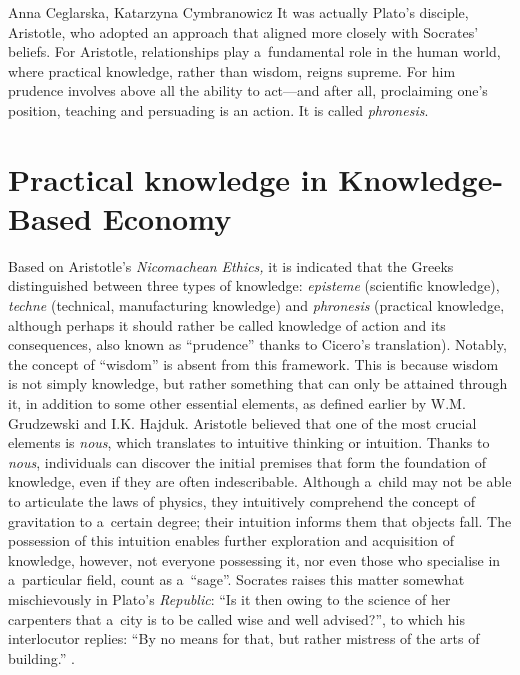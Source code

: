 \begin{artengenv2auth}{Anna Ceglarska, Katarzyna Cymbranowicz}
It was actually Plato's disciple, Aristotle, who adopted an approach that aligned more closely with Socrates' beliefs. For Aristotle, relationships play a~fundamental role in the human world, where practical knowledge, rather than wisdom, reigns supreme. For him prudence involves above all the ability to act---and after all, proclaiming one's position, teaching and persuading is an action. It is called \textit{phronesis}.



\section{Practical knowledge in Knowledge-Based Economy}

Based on Aristotle's \textit{Nicomachean Ethics,} it is indicated that the Greeks distinguished between three types of knowledge: \textit{episteme} (scientific knowledge), \textit{techne} (technical, manufacturing knowledge) and \textit{phronesis} (practical knowledge, although perhaps it should rather be called knowledge of action and its consequences, also known as ``prudence'' thanks to Cicero's translation). Notably, the concept of ``wisdom'' is absent from this framework. This is because wisdom is not simply knowledge, but rather something that can only be attained through it, in addition to some other essential elements, as defined earlier by W.M. Grudzewski and I.K. Hajduk. Aristotle believed that one of the most crucial elements is \textit{nous}, which translates to intuitive thinking or intuition. Thanks to \textit{nous}, individuals can discover the initial premises that form the foundation of knowledge, even if they are often indescribable. Although a~child may not be able to articulate the laws of physics, they intuitively comprehend the concept of gravitation to a~certain degree; their intuition informs them that objects fall. The possession of this intuition enables further exploration and acquisition of knowledge, however, not everyone possessing it, nor even those who specialise in a~particular field, count as a~``sage''. Socrates raises this matter somewhat mischievously in Plato's \textit{Republic}: ``Is it then owing to the science of her carpenters that a~city is to be called wise and well advised?'', to which his interlocutor replies: ``By no means for that, but rather mistress of the arts of building.'' 
\parencite[][IV, 428b-c]{plato_plato_1969}.%





\end{artengenv2auth}

